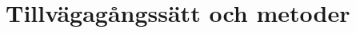 \documentclass[swedish, a4paper,12pt]{article}
\begin{document}





\section{Tillvägagångssätt och metoder}


\end{document}
